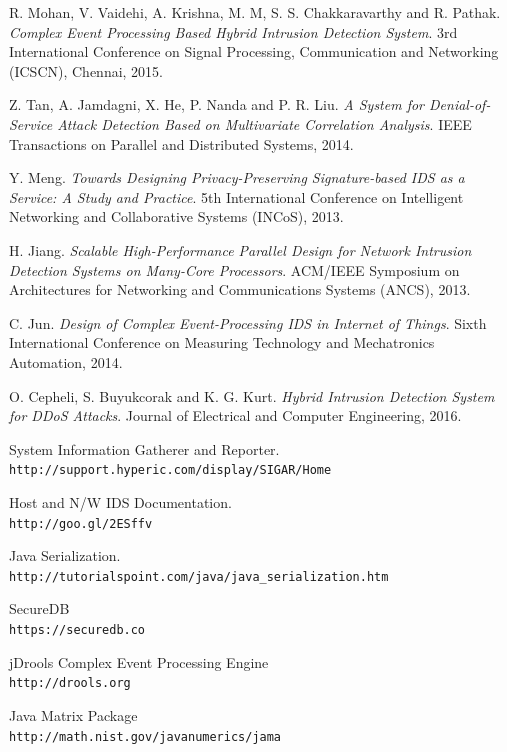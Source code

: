 \documentclass[conference]{sig-alternate-05-2015}
\begin{document}
\begin{thebibliography}{9}
R. Mohan, V. Vaidehi, A. Krishna, M. M, S. S. Chakkaravarthy and R. Pathak. 
\textit{Complex Event Processing Based Hybrid Intrusion Detection System}. 
3rd International Conference on Signal Processing, Communication and Networking (ICSCN), Chennai, 2015.

Z. Tan, A. Jamdagni, X. He, P. Nanda and P. R. Liu.
\textit{A System for Denial-of-Service Attack Detection Based on Multivariate Correlation Analysis}. 
IEEE Transactions on Parallel and Distributed Systems, 2014.
  
Y. Meng.
\textit{Towards Designing Privacy-Preserving Signature-based IDS as a Service: A Study and Practice}. 
5th International Conference on Intelligent Networking and Collaborative Systems (INCoS), 2013.

H. Jiang.
\textit{Scalable High-Performance Parallel Design for Network Intrusion Detection Systems on Many-Core Processors}. 
ACM/IEEE Symposium on Architectures for Networking and Communications Systems (ANCS), 2013.

C. Jun.
\textit{Design of Complex Event-Processing IDS in Internet of Things}. 
Sixth International Conference on Measuring Technology and Mechatronics Automation, 2014.

O. Cepheli, S. Buyukcorak and K. G. Kurt.
\textit{Hybrid Intrusion Detection System for DDoS Attacks}. 
Journal of Electrical and Computer Engineering, 2016.

System Information Gatherer and Reporter.
\\\texttt{http://support.hyperic.com/display/SIGAR/Home}

Host and N/W IDS Documentation.
\\\texttt{http://goo.gl/2ESffv}

Java Serialization.
\\\texttt{http://tutorialspoint.com/java/java\_serialization.htm}

SecureDB
\\\texttt{https://securedb.co}

jDrools Complex Event Processing Engine
\\\texttt{http://drools.org}

Java Matrix Package
\\\texttt{http://math.nist.gov/javanumerics/jama}


\end{thebibliography}
\end{document}
